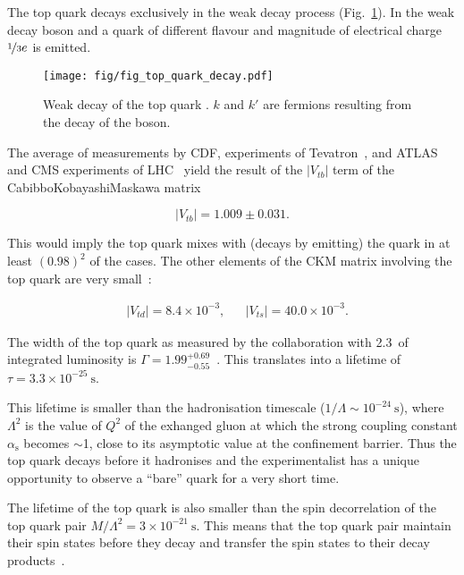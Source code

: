 The top quark decays exclusively in the weak decay process (Fig.~\ref{fig:quark_decay}). In the weak decay \PW boson and a quark of different flavour and magnitude of electrical charge $\nicefrac{1}{3}e$ is emitted.

\begin{figure}[H]
  \centering
  \texttt{[image: fig/fig\_top\_quark\_decay.pdf]}
  \caption{Weak decay of the top quark \cPqt. $k$ and $k'$ are fermions resulting from the decay of the \PW boson.}
  \label{fig:quark_decay}
\end{figure}

The average of measurements by CDF, \DZERO experiments of Tevatron~\cite{Aaltonen:2015cra}, and ATLAS and CMS experiments of LHC~\cite{twiki:tt_curve_toplhcwg_sep18} yield the result of the $|V_{tb}|$ term of the Cabibbo\textendash Kobayashi\textendash Maskawa matrix

\begin{equation}
  |V_{tb}|=1.009\pm0.031.
\end{equation}

This would imply the top quark mixes with (decays by emitting) the \cPqb quark in at least $(0.98)^{2}$ of the cases. The other elements of the CKM matrix involving the top quark are very small~\cite{Patrignani:2016xqp}:

\begin{align}
  & |V_{td}|=8.4\times10^{-3}, && |V_{ts}|=40.0\times10^{-3}.
\end{align}

The width of the top quark as measured by the \DZERO collaboration \cite{Abazov:2010tm} with 2.3~\fbinv of integrated luminosity is $\Gamma=1.99^{+0.69}_{-0.55}$~\GeV. This translates into a lifetime of $\tau=3.3\times10^{-25}~\text{s}$.

This lifetime is smaller than the hadronisation timescale ($1/\Lambda\sim10^{-24}~\text{s}$), where $\Lambda^{2}$ is the value of $Q^{2}$ of the exhanged gluon at which the strong coupling constant $\alpha_{\text{s}}$ becomes $\sim$1, close to its asymptotic value at the confinement barrier. Thus the top quark decays before it hadronises and the experimentalist has a unique opportunity to observe a ``bare'' quark for a very short time.

The lifetime of the top quark is also smaller than the spin decorrelation of the top quark pair $M/{\Lambda^{2}}=3\times10^{-21}~\text{s}$. This means that the top quark pair maintain their spin states before they decay and transfer the spin states to their decay products~\cite{Cristinziani:2016vif}.

